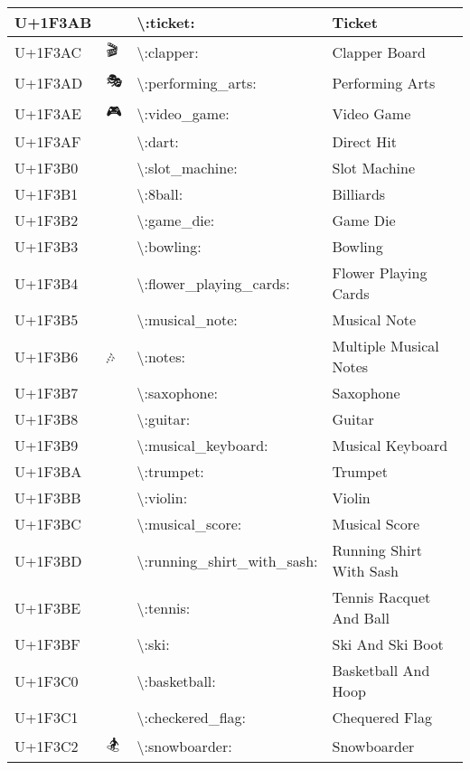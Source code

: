 \begin{table}[h]
\begin{tabulary}{\linewidth}{|L|L|L|L|}
\hline
U+1F3AB & 🎫 & {\textbackslash}:ticket: & Ticket \\
\hline
U+1F3AC & 🎬 & {\textbackslash}:clapper: & Clapper Board \\
\hline
U+1F3AD & 🎭 & {\textbackslash}:performing\_arts: & Performing Arts \\
\hline
U+1F3AE & 🎮 & {\textbackslash}:video\_game: & Video Game \\
\hline
U+1F3AF & 🎯 & {\textbackslash}:dart: & Direct Hit \\
\hline
U+1F3B0 & 🎰 & {\textbackslash}:slot\_machine: & Slot Machine \\
\hline
U+1F3B1 & 🎱 & {\textbackslash}:8ball: & Billiards \\
\hline
U+1F3B2 & 🎲 & {\textbackslash}:game\_die: & Game Die \\
\hline
U+1F3B3 & 🎳 & {\textbackslash}:bowling: & Bowling \\
\hline
U+1F3B4 & 🎴 & {\textbackslash}:flower\_playing\_cards: & Flower Playing Cards \\
\hline
U+1F3B5 & 🎵 & {\textbackslash}:musical\_note: & Musical Note \\
\hline
U+1F3B6 & 🎶 & {\textbackslash}:notes: & Multiple Musical Notes \\
\hline
U+1F3B7 & 🎷 & {\textbackslash}:saxophone: & Saxophone \\
\hline
U+1F3B8 & 🎸 & {\textbackslash}:guitar: & Guitar \\
\hline
U+1F3B9 & 🎹 & {\textbackslash}:musical\_keyboard: & Musical Keyboard \\
\hline
U+1F3BA & 🎺 & {\textbackslash}:trumpet: & Trumpet \\
\hline
U+1F3BB & 🎻 & {\textbackslash}:violin: & Violin \\
\hline
U+1F3BC & 🎼 & {\textbackslash}:musical\_score: & Musical Score \\
\hline
U+1F3BD & 🎽 & {\textbackslash}:running\_shirt\_with\_sash: & Running Shirt With Sash \\
\hline
U+1F3BE & 🎾 & {\textbackslash}:tennis: & Tennis Racquet And Ball \\
\hline
U+1F3BF & 🎿 & {\textbackslash}:ski: & Ski And Ski Boot \\
\hline
U+1F3C0 & 🏀 & {\textbackslash}:basketball: & Basketball And Hoop \\
\hline
U+1F3C1 & 🏁 & {\textbackslash}:checkered\_flag: & Chequered Flag \\
\hline
U+1F3C2 & 🏂 & {\textbackslash}:snowboarder: & Snowboarder \\

\end{tabulary}
\end{table}
